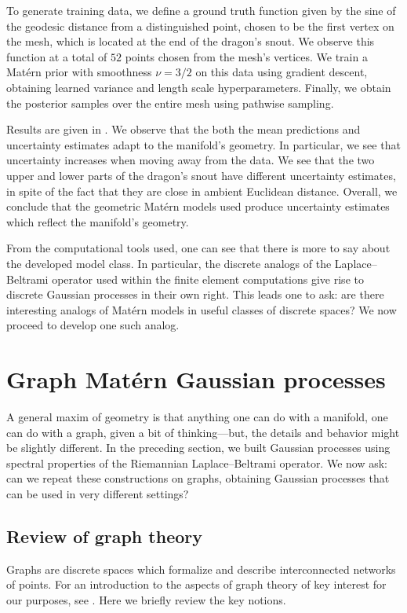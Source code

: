 \documentclass[11pt]{book}
\begin{document}
To generate training data, we define a ground truth function given by the sine of the geodesic distance from a distinguished point, chosen to be the first vertex on the mesh, which is located at the end of the dragon's snout.
We observe this function at a total of $52$ points chosen from the mesh's vertices.
We train a Matérn prior with smoothness $\nu = 3/2$ on this data using gradient descent, obtaining learned variance and length scale hyperparameters.
Finally, we obtain the posterior samples over the entire mesh using pathwise sampling.

Results are given in .
We observe that the both the mean predictions and uncertainty estimates adapt to the manifold's geometry.
In particular, we see that uncertainty increases when moving away from the data.
We see that the two upper and lower parts of the dragon's snout have different uncertainty estimates, in spite of the fact that they are close in ambient Euclidean distance.
Overall, we conclude that the geometric Matérn models used produce uncertainty estimates which reflect the manifold's geometry.

From the computational tools used, one can see that there is more to say about the developed model class.
In particular, the discrete analogs of the Laplace--Beltrami operator used within the finite element computations give rise to discrete Gaussian processes in their own right.
This leads one to ask: are there interesting analogs of Matérn models in useful classes of discrete spaces?
We now proceed to develop one such analog.

\section{Graph Matérn Gaussian processes}

A general maxim of geometry is that anything one can do with a manifold, one can do with a graph, given a bit of thinking---but, the details and behavior might be slightly different.
In the preceding section, we built Gaussian processes using spectral properties of the Riemannian Laplace--Beltrami operator.
We now ask: can we repeat these constructions on graphs, obtaining Gaussian processes that can be used in very different settings?

\subsection{Review of graph theory}
Graphs are discrete spaces which formalize and describe interconnected networks of points.
For an introduction to the aspects of graph theory of key interest for our purposes, see \textcite{spielman12}.
Here we briefly review the key notions.
\end{document}
